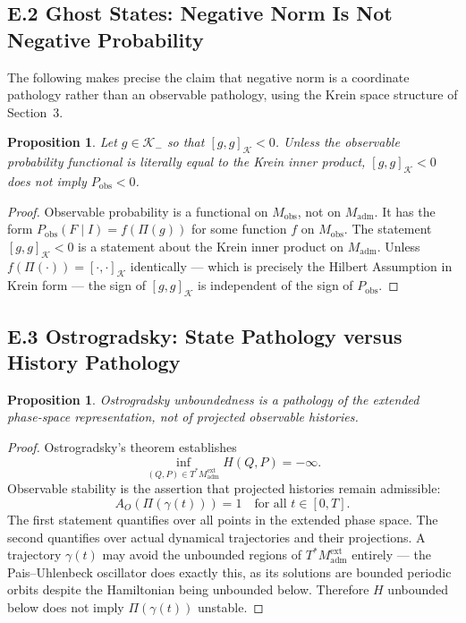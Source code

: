 \documentclass[12pt,a4paper]{article}
\newtheorem{proposition}[theorem]{Proposition}
\theoremstyle{remark}
\begin{document}
\subsection*{E.2 Ghost States: Negative Norm Is Not Negative Probability}

The following makes precise the claim that negative norm is a coordinate
pathology rather than an observable pathology, using the Krein space
structure of Section~3.

\begin{proposition}
Let $g \in \mathcal{K}_-$ so that $[g,g]_{\mathcal{K}} < 0$. Unless the
observable probability functional is literally equal to the Krein inner
product, $[g,g]_{\mathcal{K}} < 0$ does not imply $P_{\mathrm{obs}} < 0$.
\end{proposition}

\begin{proof}
Observable probability is a functional on $M_{\mathrm{obs}}$, not on
$M_{\mathrm{adm}}$. It has the form $P_{\mathrm{obs}}(F \mid I) =
f(\Pi(g))$ for some function $f$ on $M_{\mathrm{obs}}$. The statement
$[g,g]_{\mathcal{K}} < 0$ is a statement about the Krein inner product on
$M_{\mathrm{adm}}$. Unless $f(\Pi(\cdot)) = [\cdot,\cdot]_{\mathcal{K}}$
identically --- which is precisely the Hilbert Assumption in Krein form
--- the sign of $[g,g]_{\mathcal{K}}$ is independent of the sign of
$P_{\mathrm{obs}}$.
\end{proof}

\subsection*{E.3 Ostrogradsky: State Pathology versus History Pathology}

\begin{proposition}
Ostrogradsky unboundedness is a pathology of the extended phase-space
representation, not of projected observable histories.
\end{proposition}

\begin{proof}
Ostrogradsky's theorem establishes
\begin{equation*}
  \inf_{(Q,P) \in T^*\!M_{\mathrm{adm}}^{\mathrm{ext}}} H(Q,P) = -\infty.
\end{equation*}
Observable stability is the assertion that projected histories remain
admissible:
\begin{equation*}
  A_O(\Pi(\gamma(t))) = 1 \quad \text{for all } t \in [0,T].
\end{equation*}
The first statement quantifies over all points in the extended phase space.
The second quantifies over actual dynamical trajectories and their
projections. A trajectory $\gamma(t)$ may avoid the unbounded regions of
$T^*\!M_{\mathrm{adm}}^{\mathrm{ext}}$ entirely --- the Pais--Uhlenbeck
oscillator does exactly this, as its solutions are bounded periodic orbits
despite the Hamiltonian being unbounded below. Therefore $H$ unbounded
below does not imply $\Pi(\gamma(t))$ unstable.
\end{proof}
\end{document}
